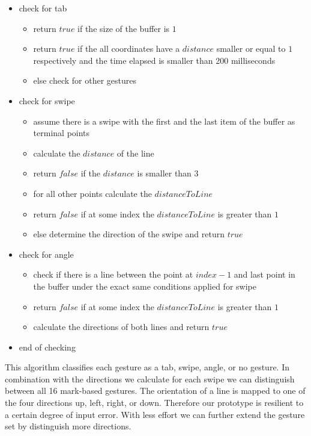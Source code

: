 \begin{tt}
\begin{itemize}
\item check for tab
	\begin{itemize}
		\item return $true$ if the size of the buffer is $1$ 
		\item return $true$ if the all coordinates have a $distance$ smaller or equal to $1$ respectively and the time elapsed is smaller than 200 milliseconds
		\item else check for other gestures
	\end{itemize}
\item check for swipe
	\begin{itemize}
	\item assume there is a swipe with the first and the last item of the buffer as terminal points
	\item calculate the $distance$ of the line
	\item return $false$ if the $distance$ is smaller than $3$
	\item for all other points calculate the $distanceToLine$ 
	\item return $false$ if at some index the $distanceToLine$ is greater than $1$
	\item else determine the direction of the swipe and return $true$
	\end{itemize}
\item check for angle
	\begin{itemize}
	\item check if there is a line between the point at $ index - 1$ and last point in the buffer under the exact same conditions applied for swipe
	\item return $false$ if at some index the $distanceToLine$ is greater than $1$
	\item calculate the directions of both lines and return $true$
	\end{itemize}
\item end of checking 
\end{itemize}
\end{tt}
This algorithm classifies each gesture as a tab, swipe, angle, or no gesture. In combination with the directions we calculate for each swipe we can distinguish between all 16 mark-based gestures. The orientation of a line is mapped to one of the four directions up, left, right, or down. Therefore our prototype is resilient to a certain degree of input error. With less effort we can further extend the gesture set by distinguish more directions. 
